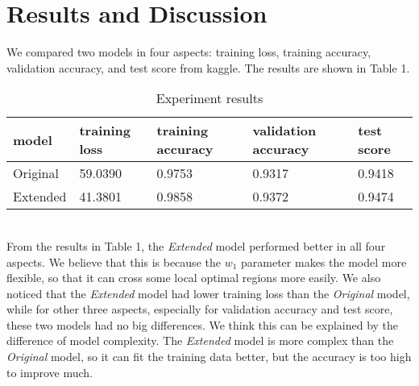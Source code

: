 \section{Results and Discussion}
We compared two models in four aspects: training loss, training accuracy, validation accuracy, and test score from kaggle. The results are shown in Table 1. \\
\begin{table}[htbp]
\label{result}
\centering
\begin{tabular}{|l|l|l|l|l|}
\hline
model    & training loss & training accuracy & validation accuracy & test score \\
\hline
Original & 59.0390       & 0.9753            & 0.9317              & 0.9418 \\
\hline
Extended & 41.3801       & 0.9858            & 0.9372              & 0.9474 \\
\hline
\end{tabular}
\caption{Experiment results}
\end{table} \\
From the results in Table 1, the \textit{Extended} model performed better in all four aspects. We believe that this is because the $w_1$ parameter makes the model more flexible, so that it can cross some local optimal regions more easily. We also noticed that the \textit{Extended} model had lower training loss than the \textit{Original} model, while for other three aspects, especially for validation accuracy and test score, these two models had no big differences. We think this can be explained by the difference of model complexity. The \textit{Extended} model is more complex than the \textit{Original} model, so it can fit the training data better, but the accuracy is too high to improve much.